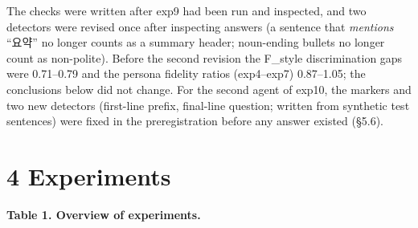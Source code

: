 \documentclass[10pt]{article}
\begin{document}
The checks were written after exp9 had been run and inspected, and two detectors were revised once after inspecting answers (a sentence that \emph{mentions} ``요약'' no longer counts as a summary header; noun-ending bullets no longer count as non-polite). Before the second revision the F\_style discrimination gaps were 0.71--0.79 and the persona fidelity ratios (exp4--exp7) 0.87--1.05; the conclusions below did not change. For the second agent of exp10, the markers and two new detectors (first-line prefix, final-line question; written from synthetic test sentences) were fixed in the preregistration before any answer existed (§5.6).

\section{4 Experiments}\label{experiments}

\textbf{Table 1. Overview of experiments.}
\end{document}

